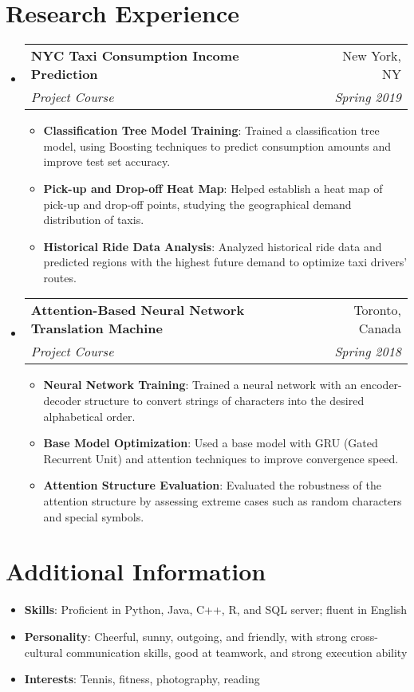 \documentclass[letterpaper,11pt]{article}
\makeatletter
\newcommand{\resumeItem}[2]{
  \item\small{
    \textbf{#1}{: #2 \vspace{-2pt}}
  }
}
\newcommand{\resumeSubheading}[4]{
  \vspace{-1pt}\item
    \begin{tabular*}{0.97\textwidth}[t]{l@{\extracolsep{\fill}}r}
      \textbf{#1} & #2 \\
      \textit{\small#3} & \textit{\small #4} \\
    \end{tabular*}\vspace{-5pt}
}
\newcommand{\resumeSubItem}[2]{\resumeItem{#1}{#2}\vspace{-4pt}}
\newcommand{\resumeSubHeadingListStart}{\begin{itemize}[leftmargin=*]}
\newcommand{\resumeSubHeadingListEnd}{\end{itemize}}
\newcommand{\resumeItemListStart}{\begin{itemize}}
\newcommand{\resumeItemListEnd}{\end{itemize}\vspace{-5pt}}
\makeatother
\begin{document}
\section{Research Experience}
\resumeSubHeadingListStart
\resumeSubheading
{NYC Taxi Consumption Income Prediction}{New York, NY}
{Project Course}{Spring 2019}
\resumeItemListStart
\resumeItem{Classification Tree Model Training}
{Trained a classification tree model, using Boosting techniques to predict consumption amounts and improve test set accuracy.}
\resumeItem{Pick-up and Drop-off Heat Map}
{Helped establish a heat map of pick-up and drop-off points, studying the geographical demand distribution of taxis.}
\resumeItem{Historical Ride Data Analysis}
{Analyzed historical ride data and predicted regions with the highest future demand to optimize taxi drivers' routes.}
\resumeItemListEnd

\resumeSubheading
{Attention-Based Neural Network Translation Machine}{Toronto, Canada}
{Project Course}{Spring 2018}
\resumeItemListStart
\resumeItem{Neural Network Training}
{Trained a neural network with an encoder-decoder structure to convert strings of characters into the desired alphabetical order.}
\resumeItem{Base Model Optimization}
{Used a base model with GRU (Gated Recurrent Unit) and attention techniques to improve convergence speed.}
\resumeItem{Attention Structure Evaluation}
{Evaluated the robustness of the attention structure by assessing extreme cases such as random characters and special symbols.}
\resumeItemListEnd

\resumeSubHeadingListEnd

\section{Additional Information}
\resumeSubHeadingListStart
\resumeSubItem{Skills}
{Proficient in Python, Java, C++, R, and SQL server; fluent in English}
\resumeSubItem{Personality}
{Cheerful, sunny, outgoing, and friendly, with strong cross-cultural communication skills, good at teamwork, and strong execution ability}
\resumeSubItem{Interests}
{Tennis, fitness, photography, reading}
\resumeSubHeadingListEnd
\end{document}
